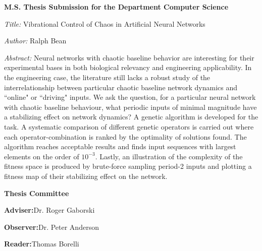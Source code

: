 
\begin{letter}

\textbf{M.S. Thesis Submission for the Department Computer Science}

\textit{Title:}
Vibrational Control of Chaos in Artificial Neural Networks

\textit{Author:}
Ralph Bean


\textit{Abstract:}
Neural networks with chaotic baseline behavior are interesting for
their experimental bases in both biological relevancy and engineering
applicability.  In the engineering case, the literature still lacks a
robust study of the interrelationship between particular chaotic baseline
network dynamics and ``online" or ``driving" inputs.  We ask the question,
for a particular neural network with chaotic baseline
behaviour, what periodic inputs of minimal magnitude have a
    stabilizing effect on network dynamics?  A genetic algorithm is
    developed for the task.  A systematic comparison of different
genetic operators is carried out where each operator-combination is
ranked by the optimality of solutions found.  The algorithm reaches
    acceptable results and finds input sequences with largest elements
    on the order of $10^{-3}$.  Lastly, an illustration of the complexity
    of the fitness space is produced by brute-force sampling period-2
    inputs and plotting a fitness map of their stabilizing effect on the
    network.

\vfill
\textbf{Thesis Committee}

\textbf{Adviser:}\hspace{14pt}Dr. Roger Gaborski \hfill \makebox[3in]{\hrulefill}

\vspace{10pt}

\textbf{Observer:}\hspace{7pt}Dr. Peter Anderson \hfill \makebox[3in]{\hrulefill}

\vspace{10pt}

\textbf{Reader:}\hspace{18pt}Thomas Borelli \hfill \makebox[3in]{\hrulefill} 


\signature{Dr. Roger Gaborski}

\end{letter}

